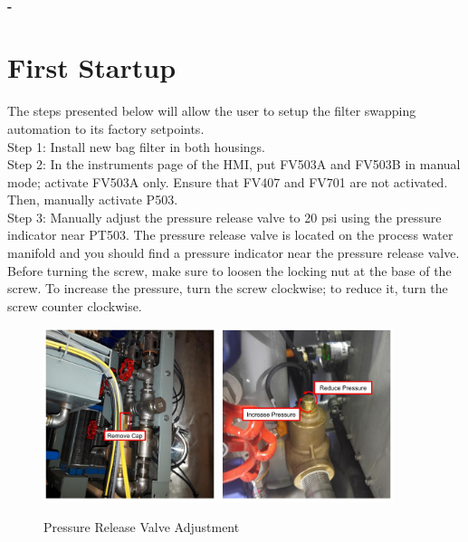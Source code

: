 
\begin{minipage}{0.90\textwidth}
\begin{centering}
\wl
\textbf{
    \Large{\reporttype}\\
    \large{\rev- \release}\\
}
\end{centering}
\end{minipage}

    


\section*{First Startup}
The steps presented below will allow the user to setup the filter swapping automation to its factory setpoints.\\

Step 1: Install new bag filter in both housings.\\

Step 2: In the instruments page of the HMI, put FV503A and FV503B in manual mode; activate FV503A only. Ensure that FV407 and FV701 are not activated. Then, manually activate P503.\\

Step 3: Manually adjust the pressure release valve to 20 psi using the pressure indicator near PT503. The pressure release valve is located on the process water manifold and you should find a pressure indicator near the pressure release valve. Before turning the screw, make sure to loosen the locking nut at the base of the screw. To increase the pressure, turn the screw clockwise; to reduce it, turn the screw counter clockwise.\\

\begin{figure}[H]
        \centering
        \includegraphics[width=0.45\textwidth]{pictures/filter_swap/prv_loc.jpg}
        \includegraphics[width=0.45\textwidth]{pictures/filter_swap/prv_mech.jpg}
        \caption{Pressure Release Valve Adjustment}
        \label{fig:cab3_conn}
\end{figure}

